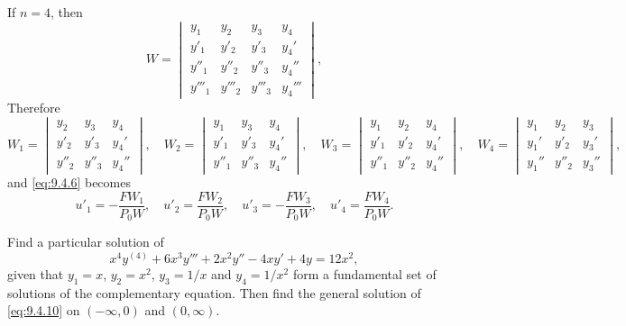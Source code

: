 If $n=4$, then
\[
W=\begin{vmatrix}
y_1&y_2&y_3&y_4 \\
y'_1&y'_2&y'_3&y_4' \\
y''_1&y''_2&y''_3&y_4''\\
y'''_1&y'''_2&y'''_3&y_4'''
\end{vmatrix},
\]
Therefore
\[
W_1=\begin{vmatrix}
y_2&y_3&y_4 \\
y'_2&y'_3&y_4'\\
y''_2&y''_3&y_4''
\end{vmatrix},
\quad W_2=\begin{vmatrix}
y_1&y_3&y_4 \\
y'_1&y'_3&y_4'\\
y''_1&y''_3&y_4''
\end{vmatrix},
\quad W_3=\begin{vmatrix}
y_1&y_2&y_4 \\
y'_1&y'_2&y_4'\\
y''_1&y''_2&y_4''
\end{vmatrix},\quad
 W_4=\begin{vmatrix}
y_1&y_2&y_3 \\
y_1'&y'_2&y_3'\\
y_1''&y''_2&y_3''
\end{vmatrix},
\]
and  \eqref{eq:9.4.6}  becomes
\begin{equation} \label{eq:9.4.9}
u'_1=-\frac{FW_1}{P_0W},\quad u'_2=\frac{FW_2}{P_0W},\quad
u'_3=-\frac{FW_3}{P_0W},\quad u'_4=\frac{FW_4}{P_0W}.
\end{equation}




\begin{example}\label{example:9.4.2}
 Find a particular solution of
\begin{equation} \label{eq:9.4.10}
x^4y^{(4)}+6x^3y'''+2x^2y''-4xy'+4y=12x^2,
\end{equation}
given that  $y_1=x$, $y_2=x^2$, $y_3=1/x$ and $y_4=1/x^2$ form a
fundamental set of solutions of the complementary equation. Then find
the general solution of \eqref{eq:9.4.10} on $(-\infty,0)$ and
$(0,\infty)$.
 \end{example}

